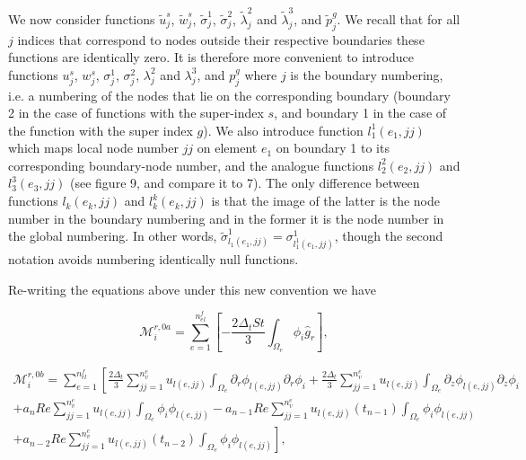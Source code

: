 \documentclass{article}
\begin{document}
We now consider functions \(\tilde{u}_j^s\), \(\tilde{w}_j^s\), \(\tilde{\sigma}_j^1\), \(\tilde{\sigma}_j^2\), \(\tilde{\lambda}_j^2\) and \(\tilde{\lambda}_j^3\), and \(\tilde{p}_j^g\). We recall that for all \(j\) indices that correspond to nodes outside their respective boundaries these functions are identically zero. It is therefore more convenient to introduce functions \(u_j^s\), \(w_j^s\), \(\sigma_j^1\), \(\sigma_j^2\), \(\lambda_j^2\) and \(\lambda_j^3\), and \(p_j^g\) where \(j\) is the boundary numbering, i.e. a numbering of the nodes that lie on the corresponding boundary (boundary 2 in the case of functions with the super-index \(s\), and boundary 1 in the case of the function with the super index \(g\)). We also introduce function \(l_1^1(e_1,jj)\) which maps local node number \(jj\) on element \(e_1\) on boundary 1 to its corresponding boundary-node number, and the analogue functions \(l_2^2(e_2,jj)\) and \(l_3^3(e_3,jj)\) (see figure 9, and compare it to 7). The only difference between functions \(l_k(e_k,jj)\) and \(l_k^k(e_k,jj)\) is that the image of the latter is the node number in the boundary numbering and in the former it is the node number in the global numbering. In other words, \(\tilde{\sigma}_{l_1(e_1,jj)}^1 = \sigma_{l_1^1(e_1,jj)}^1\), though the second notation avoids numbering identically null functions.

Re-writing the equations above under this new convention we have

\begin{equation}
\mathcal{M}_i^{r,0a} = \sum_{e=1}^{n_{el}^f} \left[ -\frac{2\Delta_t St}{3} \int_{\Omega_e} \phi_i \hat{g}_r \right], \tag{4.114}
\end{equation}

\begin{equation}
\begin{array}{l} \mathcal{M}_i^{r,0b} = \sum_{e=1}^{n_{el}^f} \left[ \frac{2\Delta_t}{3} \sum_{jj=1}^{n_v^e} u_{l(e,jj)} \int_{\Omega_e} \partial_r \phi_{l(e,jj)} \partial_r \phi_i + \frac{2\Delta_t}{3} \sum_{jj=1}^{n_v^e} u_{l(e,jj)} \int_{\Omega_e} \partial_z \phi_{l(e,jj)} \partial_z \phi_i \right. \\ + a_n Re \sum_{jj=1}^{n_v^e} u_{l(e,jj)} \int_{\Omega_e} \phi_i \phi_{l(e,jj)} - a_{n-1} Re \sum_{jj=1}^{n_v^e} u_{l(e,jj)}(t_{n-1}) \int_{\Omega_e} \phi_i \phi_{l(e,jj)} \\ \left. + a_{n-2} Re \sum_{jj=1}^{n_v^e} u_{l(e,jj)}(t_{n-2}) \int_{\Omega_e} \phi_i \phi_{l(e,jj)} \right], \end{array} \tag{4.115}
\end{equation}
\end{document}
